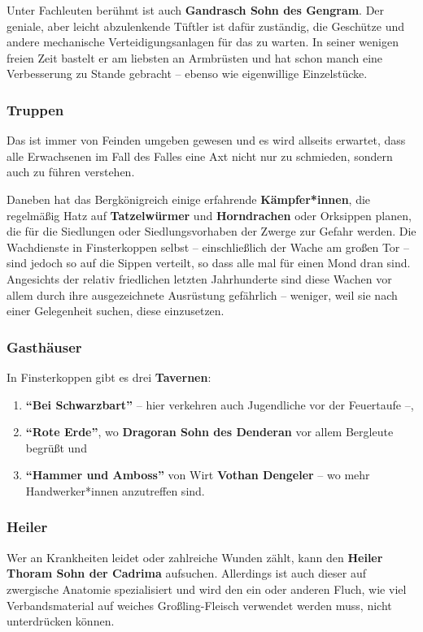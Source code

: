 Unter Fachleuten berühmt ist auch \textbf{Gandrasch Sohn des Gengram}. Der geniale, aber leicht abzulenkende Tüftler ist dafür zuständig, die Geschütze und andere mechanische Verteidigungsanlagen für das \fkv zu warten.
In seiner wenigen freien Zeit bastelt er am liebsten an Armbrüsten und hat schon manch eine Verbesserung zu Stande gebracht -- ebenso wie eigenwillige Einzelstücke.


\subsubsection{Truppen}

Das \fkv ist immer von Feinden umgeben gewesen und es wird allseits erwartet, dass alle Erwachsenen im Fall des Falles eine Axt nicht nur zu schmieden, sondern auch zu führen verstehen.

Daneben hat das Bergkönigreich einige erfahrende \textbf{Kämpfer*innen}, die regelmäßig Hatz auf \textbf{Tatzelwürmer} und \textbf{Horndrachen} oder Orksippen planen,
die für die Siedlungen oder Siedlungsvorhaben der Zwerge zur Gefahr werden.
Die Wachdienste in Finsterkoppen selbst -- einschließlich der Wache am großen Tor -- sind jedoch so auf die Sippen verteilt,
so dass alle mal für einen Mond dran sind.
Angesichts der relativ friedlichen letzten Jahrhunderte sind diese Wachen vor allem durch ihre ausgezeichnete Ausrüstung gefährlich -- weniger, weil sie nach einer Gelegenheit suchen, diese einzusetzen.

\subsubsection{Gasthäuser}
In Finsterkoppen gibt es drei \textbf{Tavernen}: 
\begin{enumerate}
\item \textbf{\enquote{Bei Schwarzbart}} -- hier verkehren auch Jugendliche vor der Feuertaufe --,
\item \textbf{\enquote{Rote Erde}}, wo \textbf{Dragoran Sohn des Denderan} vor allem Bergleute begrüßt und \item \textbf{\enquote{Hammer und Amboss}} von Wirt \textbf{Vothan Dengeler} -- wo mehr Handwerker*innen anzutreffen sind.
\end{enumerate}

\subsubsection{Heiler}
Wer an Krankheiten leidet oder zahlreiche Wunden zählt, kann den \textbf{Heiler Thoram Sohn der Cadrima} aufsuchen.
Allerdings ist auch dieser auf zwergische Anatomie spezialisiert und wird den ein oder anderen Fluch, wie viel Verbandsmaterial auf weiches Großling-Fleisch verwendet werden muss, nicht unterdrücken können.

